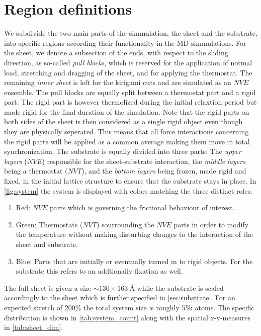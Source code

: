 

\section{Region definitions}
We subdivide the two main parts of the simmulation, the sheet and the substrate, into specific regions according their functionality in the \acrshort{MD} simmulations. For the sheet, we denote a subsection of the ends, with respect to the sliding direction, as so-called \textit{pull blocks}, which is reserved for the application of normal load, stretching and
dragging of the sheet, and for applying the thermostat. The remaining \textit{inner
sheet} is left for the kirigami cuts and are simulated as an $NVE$ ensemble. The pull blocks are equally split between a thermostat part and a rigid part. The rigid part is however thermolized during the initial relaxtion period but made rigid for the final duration of the simulation. Note that the rigid parts on both sides of the sheet is then considered as a single rigid object even though
they are physically seperated. This means that all force interactions concerning the rigid parts will be applied as a common average making them move in total synchronization. The substrate is equally divided into three parts: The
\textit{upper layers} ($NVE$) responsible for the sheet-substrate interaction, the
\textit{middle layers} being a thermostat ($NVT$), and the \textit{bottom layers} being frozen, made rigid and fixed, in the initial lattice structure to ensure that the substrate stays in place. In \cref{fig:system} the system is displayed
with colors matching the three distinct roles:
\begin{enumerate}
  \item Red: $NVE$ parts which is governing the frictional behaviour of interest.
  \item Green: Thermostats ($NVT$) sourrounding the $NVE$ parts in order to modify the temperature without making disturbing changes to the interaction of the sheet and substrate.
  \item Blue: Parts that are initially or eventually turned in to rigid objects. For the substrate this refers to an addtionally fixation as well.
\end{enumerate}
The full sheet is given a size $\sim 130 \times \SI{163}{\text{Å}}$ while the substrate is scaled accordingly to the sheet which is further specified in \cref{sec:substrate}. For an expected stretch of 200\% the total system size is roughly 55k atoms. The specific distribution is shown in \cref{tab:system_count} along with the spatial x-y-measures in \cref{tab:sheet_dim}.


